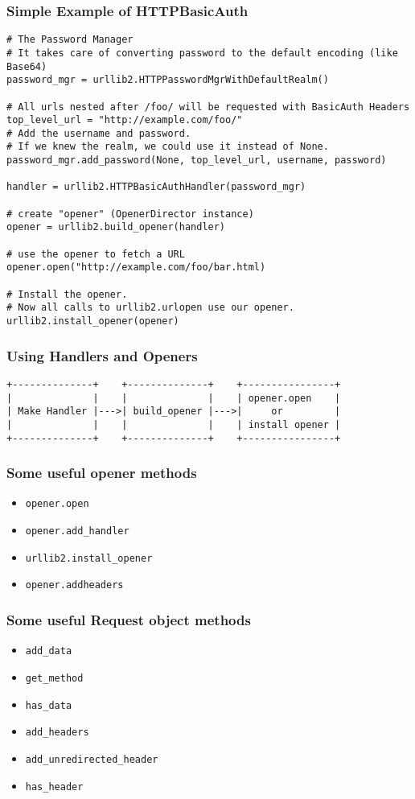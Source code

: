 \documentclass{beamer}
\begin{document}
\begin{frame}[fragile]
\frametitle{Simple Example of HTTPBasicAuth}
\label{sec-9_5}

\begin{verbatim}
# The Password Manager
# It takes care of converting password to the default encoding (like Base64)
password_mgr = urllib2.HTTPPasswordMgrWithDefaultRealm()

# All urls nested after /foo/ will be requested with BasicAuth Headers
top_level_url = "http://example.com/foo/"
# Add the username and password.
# If we knew the realm, we could use it instead of None.
password_mgr.add_password(None, top_level_url, username, password)

handler = urllib2.HTTPBasicAuthHandler(password_mgr)

# create "opener" (OpenerDirector instance)
opener = urllib2.build_opener(handler)

# use the opener to fetch a URL
opener.open("http://example.com/foo/bar.html)

# Install the opener.
# Now all calls to urllib2.urlopen use our opener.
urllib2.install_opener(opener)
\end{verbatim}
\end{frame}
\begin{frame}[fragile]
\frametitle{Using Handlers and Openers}
\label{sec-9_6}

\begin{verbatim}
+--------------+    +--------------+    +----------------+
|              |    |              |    | opener.open    |
| Make Handler |--->| build_opener |--->|     or         |
|              |    |              |    | install opener |
+--------------+    +--------------+    +----------------+
\end{verbatim}
\end{frame}
\begin{frame}
\frametitle{Some useful opener methods}
\label{sec-9_7}


\begin{itemize}
\item \texttt{opener.open}
\item \texttt{opener.add\_handler}
\item \texttt{urllib2.install\_opener}
\item \texttt{opener.addheaders}
\end{itemize}
\end{frame}
\begin{frame}
\frametitle{Some useful Request object methods}
\label{sec-9_8}


\begin{itemize}
\item \texttt{add\_data}
\item \texttt{get\_method}
\item \texttt{has\_data}
\item \texttt{add\_headers}
\item \texttt{add\_unredirected\_header}
\item \texttt{has\_header}
\end{itemize}
\end{frame}
\end{document}
